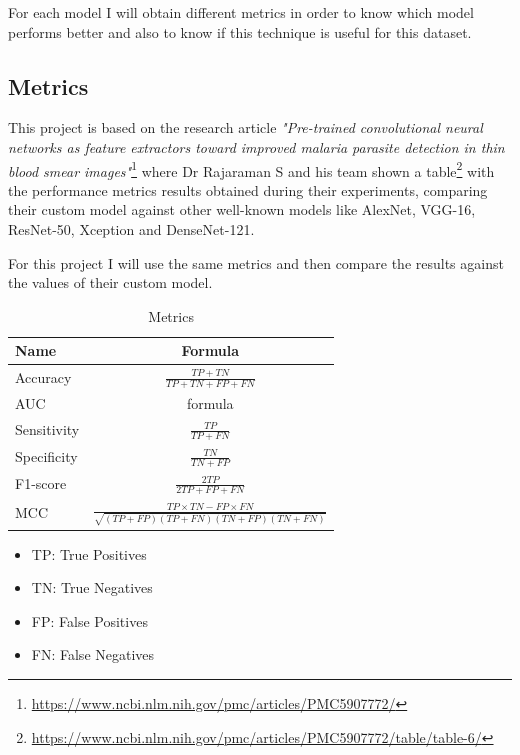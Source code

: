 \documentclass[a4paper]{article}
\begin{document}
	\medskip
	For each model I will obtain different metrics in order to know which model performs better and also to know if this technique is useful for this dataset.
	
	\subsection{Metrics}
	This project is based on the research article \textit{"Pre-trained convolutional neural networks as feature extractors toward improved malaria parasite detection in thin blood smear images"}\footnote{\label{research_paper}\url{https://www.ncbi.nlm.nih.gov/pmc/articles/PMC5907772/}} where Dr Rajaraman S and his
	team shown a table\footnote{\label{table_metrics}\url{https://www.ncbi.nlm.nih.gov/pmc/articles/PMC5907772/table/table-6/}} with the performance metrics results obtained during their experiments,
	comparing their custom model against other well-known models like AlexNet, VGG-16,
	ResNet-50, Xception and DenseNet-121.
	
	\medskip
	For this project I will use the same metrics and then compare the results against the values of
	their custom model.		
	
	\begin{table}[h!]
		\begin{center}
			\caption{Metrics}
			{\renewcommand{\arraystretch}{2}%
			\begin{tabular}{l|c}
				\textbf{Name} & \textbf{Formula} \\
				\hline
				Accuracy & $ \frac{TP + TN}{TP + TN + FP + FN} $ \\
				AUC & formula \\
				Sensitivity & $ \frac{TP}{TP + FN} $ \\
				Specificity & $ \frac{TN}{TN + FP} $ \\
				F1-score & $ \frac{2TP}{2TP + FP + FN} $ \\
				MCC & $ \frac{TP \times TN - FP \times FN}{\sqrt{(TP + FP)(TP + FN)(TN + FP)(TN + FN)}} $ \\
			\end{tabular}} \quad
		\end{center}
	\end{table}

	\medskip
	\begin{itemize}
		\item TP: True Positives
		\item TN: True Negatives
		\item FP: False Positives
		\item FN: False Negatives
	\end{itemize}
	
\end{document}
